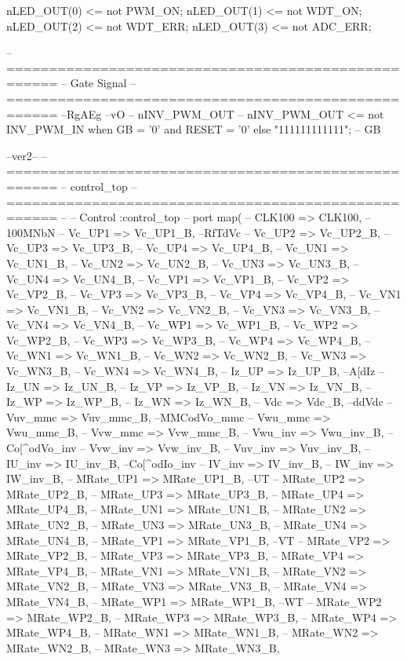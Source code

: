 \begin{mylisting}[language=VHDL,caption=トップモジュール,label=appF_Top_module_VHDL]
{{{	nLED_OUT(0)				<= not PWM_ON;
	nLED_OUT(1)				<= not WDT_ON;
	nLED_OUT(2)				<= not WDT_ERR;
	nLED_OUT(3)				<= not ADC_ERR;



-- ====================================================
-- Gate Signal
-- ====================================================
--RgAEg
--vO
-- nINV_PWM_OUT
--	nINV_PWM_OUT	<= not INV_PWM_IN when GB = '0' and RESET = '0' else "111111111111";		-- GB



--ver2--
-- ====================================================
-- control_top
-- ====================================================
--
--	Control :control_top
--		port map(
--			CLK100		=> CLK100,									--100MNbN
--			Vc_UP1		=>	Vc_UP1_B,		--RfTdVc
--			Vc_UP2		=>	Vc_UP2_B,
--			Vc_UP3		=>	Vc_UP3_B,
--			Vc_UP4		=>	Vc_UP4_B,
--			Vc_UN1		=>	Vc_UN1_B,
--			Vc_UN2		=>	Vc_UN2_B,
--			Vc_UN3		=>	Vc_UN3_B,
--			Vc_UN4		=>	Vc_UN4_B,
--			Vc_VP1		=>	Vc_VP1_B,
--			Vc_VP2		=>	Vc_VP2_B,
--			Vc_VP3		=>	Vc_VP3_B,
--			Vc_VP4		=>	Vc_VP4_B,
--			Vc_VN1		=>	Vc_VN1_B,
--			Vc_VN2		=>	Vc_VN2_B,
--			Vc_VN3		=>	Vc_VN3_B,
--			Vc_VN4		=>	Vc_VN4_B,
--			Vc_WP1		=>	Vc_WP1_B,
--			Vc_WP2		=>	Vc_WP2_B,
--			Vc_WP3		=>	Vc_WP3_B,
--			Vc_WP4		=>	Vc_WP4_B,
--			Vc_WN1		=>	Vc_WN1_B,
--			Vc_WN2		=>	Vc_WN2_B,
--			Vc_WN3		=>	Vc_WN3_B,
--			Vc_WN4		=>	Vc_WN4_B,
--			Iz_UP			=>	Iz_UP_B,			--A[dIz
--			Iz_UN			=>	Iz_UN_B,
--			Iz_VP			=>	Iz_VP_B,
--			Iz_VN			=>	Iz_VN_B,
--			Iz_WP			=>	Iz_WP_B,
--			Iz_WN			=>	Iz_WN_B,
--			Vdc			=>	Vdc_B,			--ddVdc
--			Vuv_mmc		=>	Vuv_mmc_B,		--MMCodVo_mmc
--			Vwu_mmc		=>	Vwu_mmc_B,
--			Vvw_mmc		=>	Vvw_mmc_B,
--			Vwu_inv		=>	Vwu_inv_B,		--Co[^odVo_inv
--			Vvw_inv		=>	Vvw_inv_B,
--			Vuv_inv		=>	Vuv_inv_B,
--			IU_inv		=>	IU_inv_B,		--Co[^odIo_inv
--			IV_inv		=>	IV_inv_B,
--			IW_inv		=>	IW_inv_B,
--			MRate_UP1	=>	MRate_UP1_B,		--UT
--			MRate_UP2	=>	MRate_UP2_B,
--			MRate_UP3	=>	MRate_UP3_B,
--			MRate_UP4	=>	MRate_UP4_B,
--			MRate_UN1	=>	MRate_UN1_B,
--			MRate_UN2	=>	MRate_UN2_B,
--			MRate_UN3	=>	MRate_UN3_B,
--			MRate_UN4	=>	MRate_UN4_B,
--			MRate_VP1	=>	MRate_VP1_B,		--VT
--			MRate_VP2	=>	MRate_VP2_B,
--			MRate_VP3	=>	MRate_VP3_B,
--			MRate_VP4	=>	MRate_VP4_B,
--			MRate_VN1	=>	MRate_VN1_B,
--			MRate_VN2	=>	MRate_VN2_B,
--			MRate_VN3	=>	MRate_VN3_B,
--			MRate_VN4	=>	MRate_VN4_B,
--			MRate_WP1	=>	MRate_WP1_B,		--WT
--			MRate_WP2	=>	MRate_WP2_B,
--			MRate_WP3	=>	MRate_WP3_B,
--			MRate_WP4	=>	MRate_WP4_B,
--			MRate_WN1	=>	MRate_WN1_B,
--			MRate_WN2	=>	MRate_WN2_B,
--			MRate_WN3	=>	MRate_WN3_B,
}}}
\end{mylisting}
